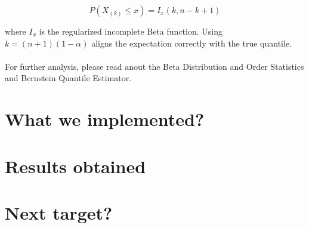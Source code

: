 \documentclass{article}
\begin{document}
\[
P(X_{(k)} \leq x) = I_x(k, n-k+1)
\]

where \( I_x \) is the regularized incomplete Beta function. Using \( k = (n+1)(1-\alpha) \) aligns the expectation correctly with the true quantile. \\\\
For further analysis, please read anout the Beta Distribution and Order Statistics and Bernstein Quantile Estimator.


\section*{What we implemented?}
\section*{Results obtained}
\section*{Next target?}
\end{document}
